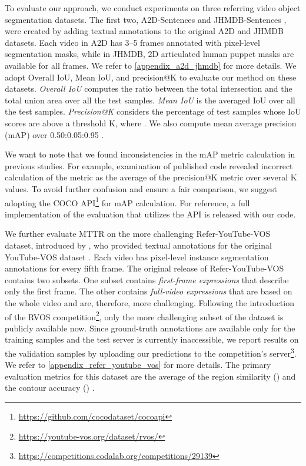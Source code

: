 \documentclass[10pt,twocolumn,letterpaper]{article}
\renewcommand{\cite}[1]{\citep{#1}}
\newcommand{\methodname}{MTTR}
\begin{document}
To evaluate our approach, we conduct experiments on three referring video object segmentation datasets.
The first two, A2D-Sentences and JHMDB-Sentences \cite{gavrilyuk2018a2d}, were created by adding textual annotations to the original A2D \cite{xu2015can} and JHMDB \cite{jhuang2013towards} datasets. Each video in A2D has 3--5 frames annotated with pixel-level segmentation masks, while in JHMDB, 2D articulated human puppet masks are available for all frames.
We refer to \cref{appendix_a2d_jhmdb} for more details.
We adopt Overall IoU, Mean IoU, and precision@K to evaluate our method on these datasets. \textit{Overall IoU} computes the ratio between the total intersection and the total union area over all the test samples. \textit{Mean IoU} is the averaged IoU over all the test samples. \textit{Precision@K} considers the percentage of test samples whose IoU scores are above a threshold K, where . We also compute mean average precision (mAP) over 0.50:0.05:0.95 \cite{lin2014coco}. 

We want to note that we found inconsistencies in the mAP metric calculation in previous studies. For example, examination of published code revealed incorrect calculation of the metric as the average of the precision@K metric over several K values.
To avoid further confusion and ensure a fair comparison, we suggest adopting the COCO API\footnote{\url{https://github.com/cocodataset/cocoapi}} for mAP calculation.  For reference, a full implementation of the evaluation that utilizes the API is released with our code.

We further evaluate \methodname{} on the more challenging Refer-YouTube-VOS dataset, introduced by \citet{seo2020urvos}, who provided textual annotations for the original YouTube-VOS dataset \cite{xu2018youtube}. Each video has pixel-level instance segmentation annotations for every fifth frame. The original release of Refer-YouTube-VOS contains two subsets. One subset contains \textit{first-frame expressions} that describe only the first frame. The other contains \textit{full-video expressions} that are based on the whole video and are, therefore, more challenging. Following the introduction of the RVOS competition\footnote{\url{https://youtube-vos.org/dataset/rvos/}}, only the more challenging subset of the dataset  is publicly available now. Since ground-truth annotations are available only for the training samples and the test server is currently inaccessible, we report results on the validation samples by uploading our predictions to the competition’s server\footnote{\url{https://competitions.codalab.org/competitions/29139}}.
We refer to \cref{appendix_refer_youtube_vos} for more details.
The primary evaluation metrics for this dataset are the average of the region similarity () and the contour accuracy () \cite{perazzi2016benchmark}.
\end{document}
